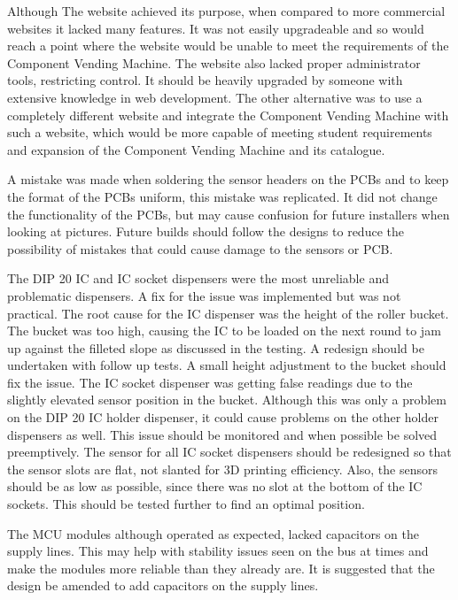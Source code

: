 \documentclass[a4paper,11pt]{article}
\numberwithin{figure}{section}
\numberwithin{table}{section}
\begin{document}
Although The website achieved its purpose, when compared to more commercial websites it lacked many features. It was not easily upgradeable and so would reach a point where the website would be unable to meet the requirements of the Component Vending Machine. The website also lacked proper administrator tools, restricting control. It should be heavily upgraded by someone with extensive knowledge in web development. The other alternative was to use a completely different website and integrate the Component Vending Machine with such a website, which would be more capable of meeting student requirements and expansion of the Component Vending Machine and its catalogue.

A mistake was made when soldering the sensor headers on the PCBs and to keep the format of the PCBs uniform, this mistake was replicated. It did not change the functionality of the PCBs, but may cause confusion for future installers when looking at pictures. Future builds should follow the designs to reduce the possibility of mistakes that could cause damage to the sensors or PCB.

The DIP 20 IC and IC socket dispensers were the most unreliable and problematic dispensers. A fix for the issue was implemented but was not practical. The root cause for the IC dispenser was the height of the roller bucket. The bucket was too high, causing the IC to be loaded on the next round to jam up against the filleted slope as discussed in the testing. A redesign should be undertaken with follow up tests. A small height adjustment to the bucket should fix the issue. The IC socket dispenser was getting false readings due to the slightly elevated sensor position in the bucket. Although this was only a problem on the DIP 20 IC holder dispenser, it could cause problems on the other holder dispensers as well. This issue should be monitored and when possible be solved preemptively. The sensor for all IC socket dispensers should be redesigned so that the sensor slots are flat, not slanted for 3D printing efficiency. Also, the sensors should be as low as possible, since there was no slot at the bottom of the IC sockets. This should be tested further to find an optimal position.

The MCU modules although operated as expected, lacked capacitors on the supply lines. This may help with stability issues seen on the bus at times and make the modules more reliable than they already are. It is suggested that the design be amended to add capacitors on the supply lines.
\end{document}
